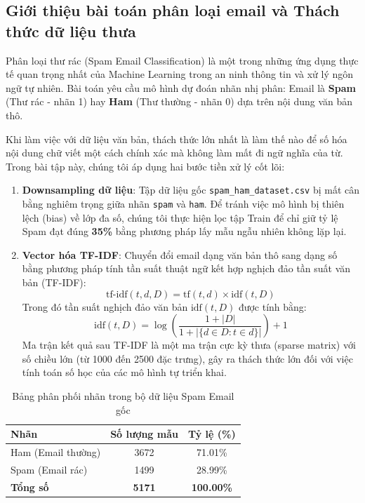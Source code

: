 \documentclass[a4paper]{article}
\begin{document}
\subsection{Giới thiệu bài toán phân loại email và Thách thức dữ liệu thưa}
Phân loại thư rác (Spam Email Classification) là một trong những ứng dụng thực tế quan trọng nhất của Machine Learning trong an ninh thông tin và xử lý ngôn ngữ tự nhiên. Bài toán yêu cầu mô hình dự đoán nhãn nhị phân: Email là \textbf{Spam} (Thư rác - nhãn 1) hay \textbf{Ham} (Thư thường - nhãn 0) dựa trên nội dung văn bản thô.

Khi làm việc với dữ liệu văn bản, thách thức lớn nhất là làm thế nào để số hóa nội dung chữ viết một cách chính xác mà không làm mất đi ngữ nghĩa của từ. Trong bài tập này, chúng tôi áp dụng hai bước tiền xử lý cốt lõi:
\begin{enumerate}
    \item \textbf{Downsampling dữ liệu}: Tập dữ liệu gốc \texttt{spam\_ham\_dataset.csv} bị mất cân bằng nghiêm trọng giữa nhãn \texttt{spam} và \texttt{ham}. Để tránh việc mô hình bị thiên lệch (bias) về lớp đa số, chúng tôi thực hiện lọc tập Train để chỉ giữ tỷ lệ Spam đạt đúng \textbf{35\%} bằng phương pháp lấy mẫu ngẫu nhiên không lặp lại.
    \item \textbf{Vector hóa TF-IDF}: Chuyển đổi email dạng văn bản thô sang dạng số bằng phương pháp tính tần suất thuật ngữ kết hợp nghịch đảo tần suất văn bản (TF-IDF):
    \begin{equation}
        \text{tf-idf}(t, d, D) = \text{tf}(t, d) \times \text{idf}(t, D)
    \end{equation}
    Trong đó tần suất nghịch đảo văn bản $\text{idf}(t, D)$ được tính bằng:
    \begin{equation}
        \text{idf}(t, D) = \log \left( \frac{1 + |D|}{1 + |\{d \in D : t \in d\}|} \right) + 1
    \end{equation}
    Ma trận kết quả sau TF-IDF là một ma trận cực kỳ thưa (sparse matrix) với số chiều lớn (từ 1000 đến 2500 đặc trưng), gây ra thách thức lớn đối với việc tính toán số học của các mô hình tự triển khai.
\end{enumerate}

\begin{table}[H]
\centering
\caption{Bảng phân phối nhãn trong bộ dữ liệu Spam Email gốc}
\label{tab:spam_distribution}
\begin{tabular}{lcc}
\toprule
\textbf{Nhãn} & \textbf{Số lượng mẫu} & \textbf{Tỷ lệ (\%)} \\ \midrule
Ham (Email thường) & 3672 & 71.01\% \\
Spam (Email rác) & 1499 & 28.99\% \\ \midrule
\textbf{Tổng số} & \textbf{5171} & \textbf{100.00\%} \\ \bottomrule
\end{tabular}
\end{table}
\end{document}
